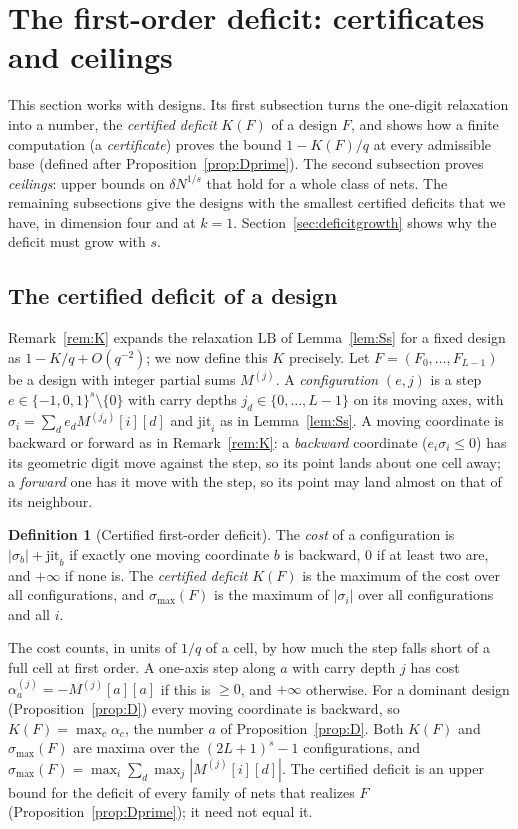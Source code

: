 \documentclass[11pt]{amsart}
\theoremstyle{definition}
\newtheorem{definition}[theorem]{Definition}
\theoremstyle{plain}
\begin{document}
\section{The first-order deficit: certificates and ceilings}\label{sec:deficit}
This section works with designs. Its first subsection turns the one-digit relaxation into a number, the \emph{certified deficit} $K(F)$ of a design $F$, and shows how a finite computation (a \emph{certificate}) proves the bound $1-K(F)/q$ at every admissible base (defined after Proposition~\ref{prop:Dprime}). The second subsection proves \emph{ceilings}: upper bounds on $\delta N^{1/s}$ that hold for a whole class of nets. The remaining subsections give the designs with the smallest certified deficits that we have, in dimension four and at $k=1$. Section~\ref{sec:deficitgrowth} shows why the deficit must grow with $s$.

\subsection{The certified deficit of a design}
Remark~\ref{rem:K} expands the relaxation $\mathrm{LB}$ of Lemma~\ref{lem:Ss} for a fixed design as $1-K/q+O(q^{-2})$; we now define this $K$ precisely. Let $F=(F_0,\dots,F_{L-1})$ be a design with integer partial sums $M^{(j)}$. A \emph{configuration} $(e,j)$ is a step $e\in\{-1,0,1\}^s\setminus\{0\}$ with carry depths $j_d\in\{0,\dots,L-1\}$ on its moving axes, with $\sigma_i=\sum_de_dM^{(j_d)}[i][d]$ and $\mathrm{jit}_i$ as in Lemma~\ref{lem:Ss}. A moving coordinate is backward or forward as in Remark~\ref{rem:K}: a \emph{backward} coordinate ($e_i\sigma_i\le0$) has its geometric digit move against the step, so its point lands about one cell away; a \emph{forward} one has it move with the step, so its point may land almost on that of its neighbour.

\begin{definition}[Certified first-order deficit]\label{def:K}
The \emph{cost} of a configuration is $|\sigma_b|+\mathrm{jit}_b$ if exactly one moving coordinate $b$ is backward, $0$ if at least two are, and $+\infty$ if none is. The \emph{certified deficit} $K(F)$ is the maximum of the cost over all configurations, and $\sigma_{\max}(F)$ is the maximum of $|\sigma_i|$ over all configurations and all $i$.
\end{definition}

The cost counts, in units of $1/q$ of a cell, by how much the step falls short of a full cell at first order. A one-axis step along $a$ with carry depth $j$ has cost $\alpha^{(j)}_a=-M^{(j)}[a][a]$ if this is $\ge0$, and $+\infty$ otherwise. For a dominant design (Proposition~\ref{prop:D}) every moving coordinate is backward, so $K(F)=\max_c\alpha_c$, the number $a$ of Proposition~\ref{prop:D}. Both $K(F)$ and $\sigma_{\max}(F)$ are maxima over the $(2L+1)^s-1$ configurations, and $\sigma_{\max}(F)=\max_i\sum_d\max_j|M^{(j)}[i][d]|$. The certified deficit is an upper bound for the deficit of every family of nets that realizes $F$ (Proposition~\ref{prop:Dprime}); it need not equal it.
\end{document}
